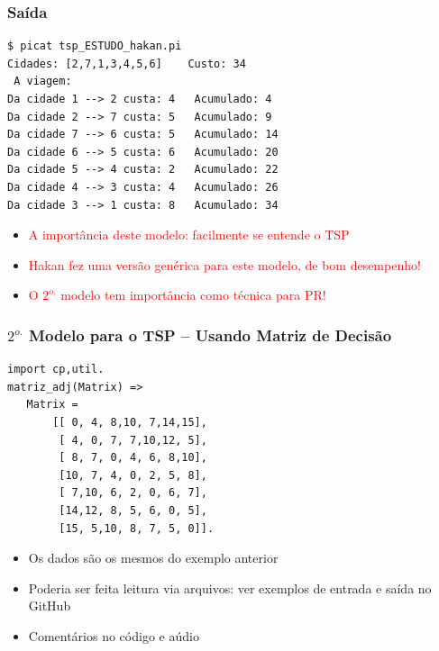 \begin{frame}[fragile]
 \frametitle{Saída}

\begin{footnotesize}
\begin{verbatim}
$ picat tsp_ESTUDO_hakan.pi 
Cidades: [2,7,1,3,4,5,6]	Custo: 34
 A viagem: 
Da cidade 1 --> 2 custa: 4	 Acumulado: 4
Da cidade 2 --> 7 custa: 5	 Acumulado: 9
Da cidade 7 --> 6 custa: 5	 Acumulado: 14
Da cidade 6 --> 5 custa: 6	 Acumulado: 20
Da cidade 5 --> 4 custa: 2	 Acumulado: 22
Da cidade 4 --> 3 custa: 4	 Acumulado: 26
Da cidade 3 --> 1 custa: 8	 Acumulado: 34
\end{verbatim}
\end{footnotesize}
\pause

\begin{itemize}
  \item \textcolor{red}{A importância deste modelo: facilmente se entende o TSP}
  \pause
   \item \textcolor{red}{Hakan fez uma versão genérica para este modelo, de bom desempenho!}
  \pause
   \item \textcolor{red}{O $2^{o.}$ modelo tem importância como técnica para PR!}


\end{itemize}



\end{frame}

\begin{frame}[fragile]
\frametitle{$2^{o.}$ Modelo para o TSP -- Usando Matriz de Decisão}

\begin{footnotesize}
\begin{verbatim}
import cp,util.
matriz_adj(Matrix) =>
   Matrix = 
       [[ 0, 4, 8,10, 7,14,15],
        [ 4, 0, 7, 7,10,12, 5],
        [ 8, 7, 0, 4, 6, 8,10],
        [10, 7, 4, 0, 2, 5, 8],
        [ 7,10, 6, 2, 0, 6, 7],
        [14,12, 8, 5, 6, 0, 5],
        [15, 5,10, 8, 7, 5, 0]].
\end{verbatim}
\end{footnotesize}


\begin{itemize}
  \item Os dados são os mesmos do exemplo anterior
  \item Poderia ser feita leitura via arquivos: ver exemplos de entrada e saída no GitHub
  \item Comentários no código e aúdio
  \end{itemize}

\end{frame}

